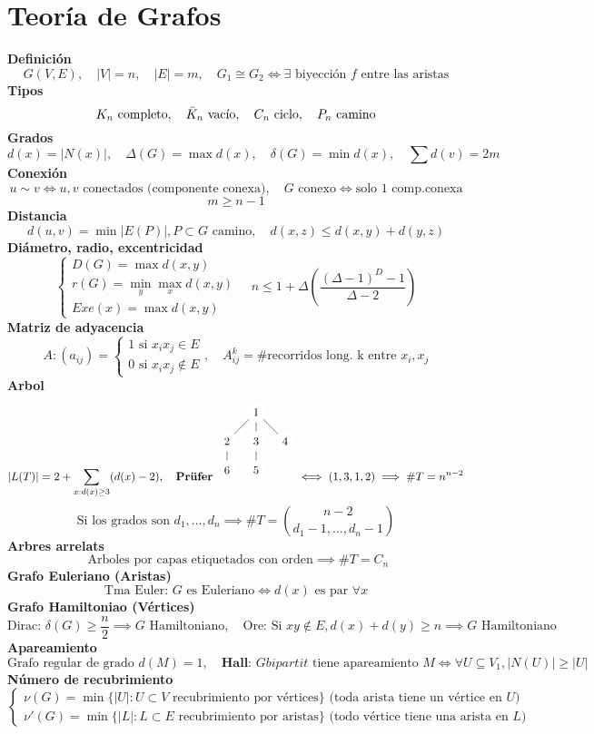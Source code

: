 \documentclass{article}
\newcommand{\h}{\hspace{1em}}
\renewcommand{\t}[1]{\text{#1}}
\begin{document}
\section{Teoría de Grafos}
\textbf{Definición}
\[G(V, E), \h |V|=n, \h |E|=m, \h G_1\cong G_2 \iff \exists \text{ biyección } f \text{ entre las aristas} \]
\textbf{Tipos}\\
\[K_n \text{ completo},\h \Bar{K}_n \text{ vacío},\h C_n \text{ ciclo},\h P_n \text{ camino} \]
\textbf{Grados}
\[d(x)=|N(x)|, \h \Delta(G)=\max d(x), \h \delta(G)=\min d(x), \h \sum d(v)= 2m\]
\textbf{Conexión}
\[u\sim v \iff u, v \text{ conectados (componente conexa)}, \h G \text{ conexo} \iff \text{solo 1 comp.conexa}\]
\[m\geq n-1\]
\textbf{Distancia}
\[d(u,v)= \min{|E(P)|}, P\subset G \text{ camino}, \h d(x, z)\leq d(x,y)+d(y,z)\]
\textbf{Diámetro, radio, excentricidad}
\[\begin{cases} 
D(G)=\max{d(x, y)} \\
r(G)=\min_y{\max_x{d(x,y)}} \\
Exe(x) = \max{d(x,y)}
\end{cases} \h n\leq 1+\Delta\left( \frac{(\Delta-1)^D-1}{\Delta -2} \right)\]
\textbf{Matriz de adyacencia}
\[A:(a_{ij})=\begin{cases} 1 \text{ si } x_ix_j\in E \\ 0 \text{ si } x_ix_j\notin E  \end{cases}, \h A_{ij}^k=\# \text{recorridos long. k entre } x_i, x_j\]
\textbf{Arbol}
\[|L(T)|=2 + \sum_{x:d(x)\geq 3}(d(x)-2) , \h \textbf{Prüfer }
\begin{tikzpicture}
  [scale=.18,auto=left,every node/.style={circle,fill=white!20}]
  \node (n6) at (0,-5) {6};
  \node (n4) at (10,0)  {4};
  \node (n5) at (5,-5)  {5};
  \node (n1) at (5,5) {1};
  \node (n2) at (0,0)  {2};
  \node (n3) at (5,0)  {3};

  \foreach \from/\to in {n1/n2, n1/n3, n1/n4, n2/n6, n3/n5}
    \draw (\from) -- (\to);

\end{tikzpicture} 
\iff (1,3,1,2) \implies \# T=n^{n-2}
\]
\[\t{Si los grados son } d_1, \ldots , d_n \implies \#T = \binom{n-2}{d_1-1, \ldots , d_n-1} \]
\textbf{Arbres arrelats}
\[\t{ Arboles por capas etiquetados con orden} \implies \#T=C_n \]
\textbf{Grafo Euleriano (Aristas)}
\[\t{Tma Euler: }G \t{ es Euleriano} \iff d(x) \t{ es par }\forall x\]
\textbf{Grafo Hamiltoniao (Vértices)}
$$
\t{Dirac: } \delta(G)\geq\dfrac{n}{2} \implies G \text{ Hamiltoniano}, \h \t{Ore: } \t{Si } xy \notin E, d(x) + d(y)\geq n  \implies G \text{ Hamiltoniano}
$$
\textbf{Apareamiento}
$$
\text{Grafo regular de grado } d(M)=1, \h \textbf{Hall: } G bipartit \text{ tiene apareamiento } M \iff \forall U\subseteq V_1, |N(U)| \geq | U| 
$$
\textbf{Número de recubrimiento}
$$\begin{cases}
\nu(G) = \min\{|U|: U\subset V \text{ recubrimiento por vértices}\} \text{ (toda arista tiene un vértice en }U)  \\
\nu'(G) = \min\{|L|: L\subset E \text{ recubrimiento por aristas}\}  \text{ (todo vértice tiene una arista en }L)
\end{cases}
$$
\end{document}
